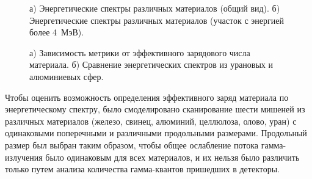\begin{figure}[t]
    \begin{center}
        \begin{minipage}[h]{0.49\linewidth}
        \end{minipage}
        \hfill
        \begin{minipage}[h]{0.49\linewidth}
        \end{minipage} 
        \caption{а) Энергетические спектры различных материалов (общий вид).
            б) Энергетические спектры различных материалов (участок с энергией более 4~МэВ).}
    \end{center}
    \label{pic:diff0}
\end{figure}
\begin{figure}[t]
    \begin{center}
        \begin{minipage}[h]{0.49\linewidth}
        \end{minipage}
        \hfill
        \begin{minipage}[h]{0.49\linewidth}
        \end{minipage}
        \caption{а) Зависимость метрики от эффективного зарядового числа материала.
            б) Сравнение энергетических спектров из урановых и алюминиевых сфер.}
    \end{center}
    \label{pic:diff}
\end{figure}

Чтобы оценить возможность определения эффективного заряд материала по энергетическому спектру, было смоделировано сканирование шести мишеней из различных материалов (железо, свинец, алюминий, целлюлоза, олово, уран) с одинаковыми поперечными и различными продольными размерами. Продольный размер был выбран таким образом, чтобы общее ослабление потока гамма-излучения было одинаковым для всех материалов, и их нельзя было различить только путем анализа количества гамма-квантов пришедших в детекторы.

